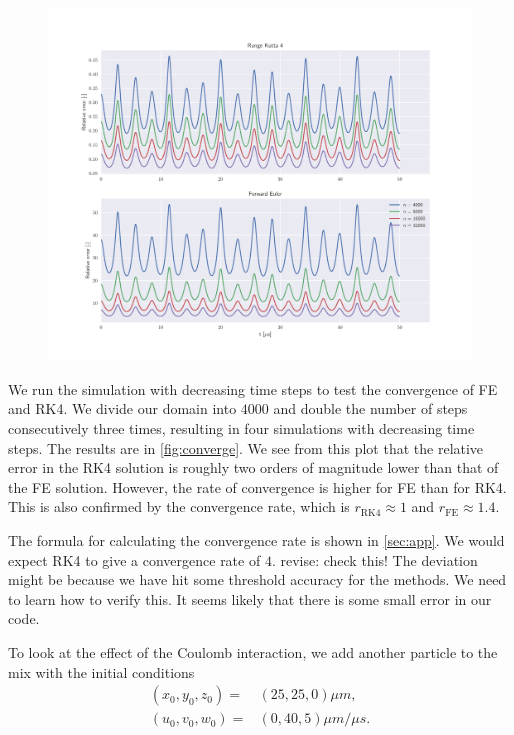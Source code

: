 \begin{figure}
\centering
\includegraphics[scale = 1]{../figures/convergence.pdf}
\caption{}
\label{fig:converge}
\end{figure}

We run the simulation with decreasing time steps to test the convergence of FE and RK4.
We divide our domain into $4000$ and double the number of steps consecutively three times,
resulting in four simulations with decreasing time steps. The results are in \autoref{fig:converge}.
We see from this plot that the relative error in the RK4 solution is roughly two orders of magnitude lower
than that of the FE solution. However, the rate of convergence is higher for FE than for
RK4. This is also confirmed by the convergence rate, which is $r_{\text{RK4}} \approx 1$ and $r_{\text{FE}} \approx 1.4$.

The formula for calculating the convergence rate is
shown in \autoref{sec:app}.
We would expect RK4 to give a convergence rate of $4$.
revise: check this!
The deviation might be because we
have hit some threshold accuracy for the methods. We need to learn how to verify this.
It seems likely that there is some small error in our code.

To look at the effect of the Coulomb interaction, we add another particle to the mix with the initial
conditions
\begin{align}
  (x_0, y_0, z_0) =& (25, 25, 0)\mu m, \\
  (u_0, v_0, w_0) =& (0, 40, 5) \mu m / \mu s.
\end{align}


